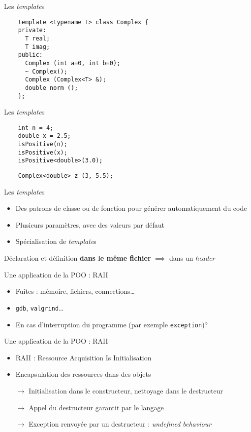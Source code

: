 \begin{frame}[fragile]{Les \textit{template}s}
  \begin{lstlisting}
    template <typename T> class Complex {
    private:
      T real;
      T imag;
    public:
      Complex (int a=0, int b=0);
      ~ Complex();
      Complex (Complex<T> &);
      double norm ();
    };
  \end{lstlisting}
\end{frame}

\begin{frame}[fragile]{Les \textit{template}s}
  \begin{lstlisting}
    int n = 4;
    double x = 2.5;
    isPositive(n);
    isPositive(x);
    isPositive<double>(3.0);
  \end{lstlisting}

  \begin{lstlisting}
    Complex<double> z (3, 5.5);
  \end{lstlisting}
\end{frame}

\begin{frame}{Les \textit{template}s}
  \begin{itemize}
  \item  Des patrons de classe ou de fonction pour générer automatiquement du code
  \item Plusieurs paramètres, avec des valeurs par défaut
  \item Spécialisation de \textit{template}s
  \end{itemize}

  Déclaration et définition \textbf{dans le même fichier} $\implies$ dans un \textit{header}
\end{frame}

\begin{frame}{Une application de la POO : RAII}
  \begin{itemize}
  \item Fuites : mémoire, fichiers, connections\dots{}
  \item \texttt{gdb}, \texttt{valgrind}\dots{}
  \item En cas d'interruption du programme (par exemple \texttt{exception})?
  \end{itemize}
\end{frame}

\begin{frame}{Une application de la POO : RAII}
  \begin{itemize}
  \item RAII : Ressource Acquisition Is Initialisation
  \item Encapsulation des ressources dans des objets
  \item[$\rightarrow$] Initialisation dans le constructeur, nettoyage dans le destructeur
  \item[$\rightarrow$] Appel du destructeur garantit par le langage
  \item[$\rightarrow$] Exception renvoyée par un destructeur : \textit{undefined behaviour}
  \end{itemize}
\end{frame}
